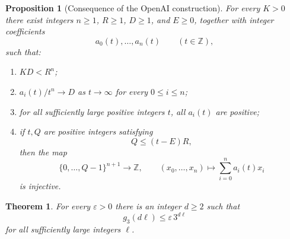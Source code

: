 \documentclass[10pt,a4paper]{amsart}
\newtheorem{theorem}{Theorem}
\newtheorem{proposition}{Proposition}
\newcommand{\Z}{\mathbb Z}
\newcommand{\ee}{\varepsilon}
\begin{document}
\begin{proposition}[Consequence of the OpenAI construction]\label{prop:openai}
For every $K>0$ there exist integers $n\ge1$, $R\ge1$, $D\ge1$, and $E\ge0$, together with integer coefficients
\[
 a_0(t),\ldots,a_n(t)\qquad(t\in\Z),
\]
such that:
\begin{enumerate}
\item $KD<R^n$;
\item $a_i(t)/t^n\to D$ as $t\to\infty$ for every $0\le i\le n$;
\item for all sufficiently large positive integers $t$, all $a_i(t)$ are positive;
\item if $t,Q$ are positive integers satisfying
\[
 Q\le (t-E)R,
\]
then the map
\[
 \{0,\ldots,Q-1\}^{n+1}\longrightarrow\Z,
 \qquad
 (x_0,\ldots,x_n)\longmapsto\sum_{i=0}^n a_i(t)x_i
\]
is injective.
\end{enumerate}
\end{proposition}

\begin{theorem}\label{thm:main}
For every $\ee>0$ there is an integer $d\ge2$ such that
\[
 g_3(d\ell)\le \ee\,3^{d\ell}
\]
for all sufficiently large integers $\ell$.
\end{theorem}
\end{document}
